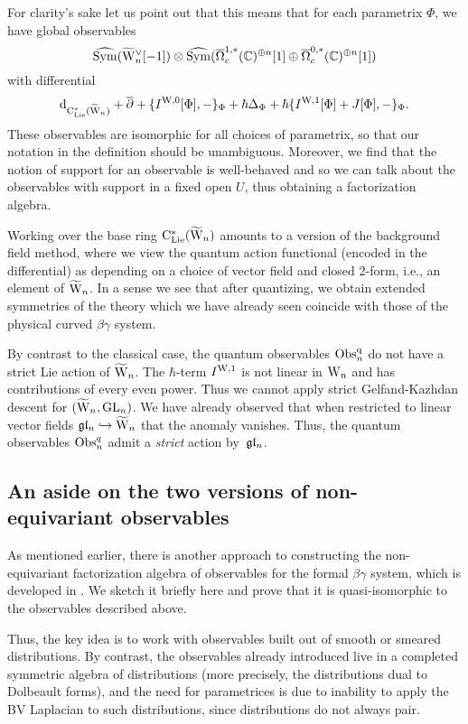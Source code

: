 For clarity's sake let us point out that this means that for each parametrix $\Phi$, we have global observables
\[
\widehat{{\rm Sym}}(\widetilde{{{\rm W}}}_n^\vee[-1]) \otimes \widehat{{\rm Sym}}(\overline{\Omega}^{1,*}_c(\mathbb C)^{\oplus n}[1] \oplus \overline{\Omega}^{0,*}_c(\mathbb C)^{\oplus n}[1])
\]
with differential 
\[
{\rm d}_{{\rm C}_{\rm Lie}^*(\widetilde{{{\rm W}}}_n)} + \overline{\partial} + \{I^{{\rm W},0}[\Phi],-\}_\Phi + \hbar \Delta_\Phi + \hbar \{I^{{\rm W},1}[\Phi]+J[\Phi],-\}_\Phi.
\]
These observables are isomorphic for all choices of parametrix,
so that our notation in the definition should be unambiguous.
Moreover, we find that the notion of support for an observable is well-behaved 
and so we can talk about the observables with support in a fixed open $U$,
thus obtaining a factorization algebra.

\begin{rmk}
Working over the base ring ${\rm C}_{\rm Lie}^*(\widetilde{{{\rm W}}}_n)$ amounts to a version of the background field method,
where we view the quantum action functional (encoded in the differential) as depending on a choice of vector field and closed 2-form,
i.e., an element of $\widetilde{{{\rm W}}}_n$.
In a sense we see that after quantizing, we obtain extended symmetries
of the theory which we have already seen coincide with those of the
physical curved $\beta\gamma$ system.
\end{rmk}

By contrast to the classical case, the quantum observables ${\rm Obs}^{\rm q}_n$ do not have a strict Lie action of $\widetilde{{{\rm W}}}_n$.
The $\hbar$-term $I^{{\rm W},1}$ is not linear in ${{\rm W}_n}$ and has
contributions of every even power.
Thus we cannot apply strict Gelfand-Kazhdan descent for
$(\widetilde{{{\rm W}}}_n,{\rm GL}_n)$. We have already observed that when restricted to
linear vector fields $\mathfrak{g} \mathfrak{l}_n \hookrightarrow \widetilde{{{\rm W}}}_n$ that the anomaly
vanishes. Thus, the quantum observables ${\rm Obs}^q_n$ admit a {\it strict} action by~$\mathfrak{g} \mathfrak{l}_n$.

\subsection{An aside on the two versions of non-equivariant observables}
\label{noneqsec}

As mentioned earlier, there is another approach to constructing the non-equivariant factorization algebra of observables
for the formal $\beta\gamma$ system, which is developed in \cite{CG}.
We sketch it briefly here and prove that it is quasi-isomorphic to the observables described above.

Thus, the key idea is to work with observables built out of smooth or smeared distributions.
By contrast, the observables already introduced live in a completed symmetric algebra of distributions 
(more precisely, the distributions dual to Dolbeault forms),
and the need for parametrices is due to inability to apply the BV Laplacian to such distributions,
since distributions do not always pair.

